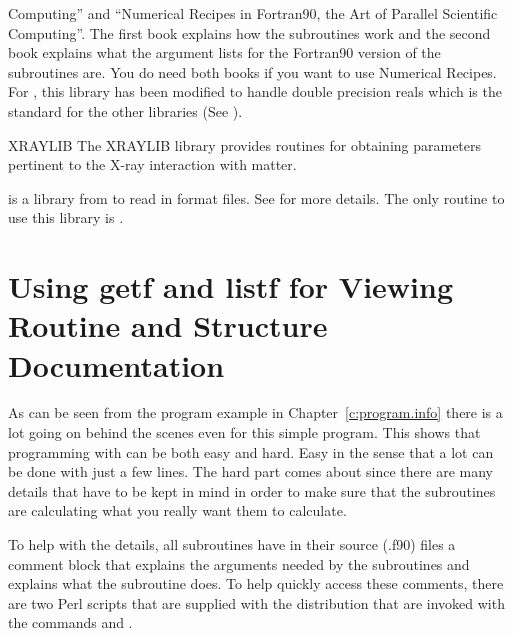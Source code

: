 \begin{description}
Computing'' and ``Numerical Recipes in Fortran90, the Art of Parallel
Scientific Computing''\cite{b:nr}.  The first book explains how the
subroutines work and the second book explains what the argument lists
for the Fortran90 version of the subroutines are. You do need both
books if you want to use Numerical Recipes. For \bmad, this library
has been modified to handle double precision reals which is the
standard for the other libraries (See ).
  \item{XRAYLIB}
The XRAYLIB library provides routines for obtaining parameters
pertinent to the X-ray interaction with matter.
  \item[xsif] 
 is a library from  to read in  format files. See 
 for more details. The only
\bmad routine to use this library is .
\end{description}

\section{Using getf and listf for Viewing Routine and Structure Documentation}
\label{s:getf}

As can be seen from the program example in Chapter~\ref{c:program.info}
there is a lot going on behind the scenes even for this
simple program. This shows that programming with \bmad can be both easy
and hard. Easy in the sense that a lot can be done with just a few
lines. The hard part comes about since there are many details that
have to be kept in mind in order to make sure that the subroutines
are calculating what you really want them to calculate.

To help with the details, all \bmad subroutines have in their source (.f90)
files a comment block that explains the arguments needed by the
subroutines and explains what the subroutine does. To help quickly
access these comments, there are two Perl scripts that are supplied
with the \bmad distribution that are invoked with the commands
 and .

